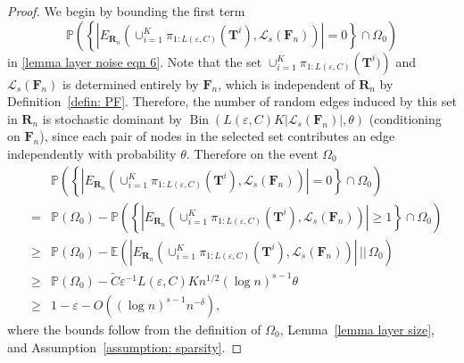 \documentclass[twoside,11pt]{article}
\theoremstyle{remark}
\begin{document}
\begin{proof}
We begin by bounding the first term 
\begin{equation*}
\mathbb{P}\left(\left\{\left|E_{\boldsymbol{R}_n}\left(\cup_{i=1}^K \pi_{1:L\left(\varepsilon,C\right)}\left(\boldsymbol{T}^i\right),\mathcal{L}_s\left(\boldsymbol{F}_n\right)\right)\right|=0\right\}\cap \Omega_0 \right)
\end{equation*}
 in \eqref{lemma layer noise eqn 6}. 
Note that the set $\cup_{i=1}^K \pi_{1:L\left(\varepsilon,C\right)}\left(\boldsymbol{T}^i)\right)$ and $\mathcal{L}_s\left(\boldsymbol{F}_n\right)$
is determined entirely by $\bm{F}_n$, which is independent of $\boldsymbol{R}_n$ by Definition~\ref{defin: PF}. Therefore, the number of random edges induced by this set in $\boldsymbol{R}_n$ is stochastic dominant by $\operatorname{Bin} \left( L\left(\varepsilon,C\right)K \left|\mathcal{L}_s\left(\boldsymbol{F}_n\right)\right|, \theta \right)$ (conditioning on $\bm{F}_n$),
since each pair of nodes in the selected set contributes an edge independently with probability $\theta$. Therefore on the event $\Omega_0$
%
\begingroup
\begin{eqnarray}
\label{lemma layer noise eqn 7}
\nonumber
&&\mathbb{P}\left(\left\{\left|E_{\boldsymbol{R}_n}\left(\cup_{i=1}^K \pi_{1:L\left(\varepsilon,C\right)}\left(\boldsymbol{T}^i\right),\mathcal{L}_s\left(\boldsymbol{F}_n\right)\right)\right|=0\right\}\cap \Omega_0 \right)\\
\nonumber
&=& \mathbb P(\Omega_0)- \mathbb{P}\left(\left\{\left|E_{\boldsymbol{R}_n}\left(\cup_{i=1}^K \pi_{1:L\left(\varepsilon,C\right)}\left(\boldsymbol{T}^i\right),\mathcal{L}_s\left(\boldsymbol{F}_n\right)\right)\right|\ge 1\right\}\cap \Omega_0\right)\\
\nonumber
&\geq & \mathbb P(\Omega_0)- \mathbb{E}\left(\left|E_{\boldsymbol{R}_n}\left(\cup_{i=1}^K \pi_{1:L\left(\varepsilon,C\right)}\left(\boldsymbol{T}^i\right),\mathcal{L}_s\left(\boldsymbol{F}_n\right)\right)\right| \, \bigg |\!\!\biggl|\, \Omega_0\right)\\
\nonumber
&\ge &\mathbb P(\Omega_0)- \tilde{C} \varepsilon^{-1}L\left(\varepsilon,C\right)Kn^{1/2}\left(\log n\right)^{s-1}\theta\\
&\geq&1-\varepsilon- O\left(\left(\log n\right)^{s-1}n^{-\delta}\right),
\end{eqnarray}
\endgroup
%
where the bounds follow from the definition of $\Omega_0$, Lemma~\ref{lemma layer size}, and Assumption~\ref{assumption: sparsity}.


\end{proof}
\end{document}
